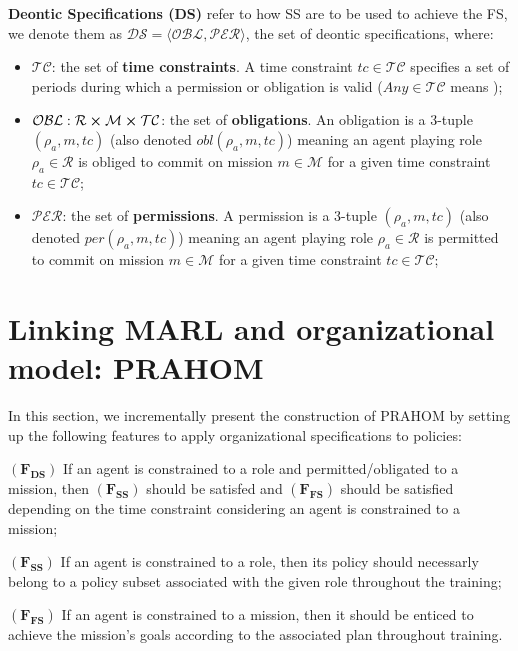 \documentclass[runningheads]{llncs}
\theoremstyle{freethm}
\theoremstyle{proofoutline}
\begin{document}
\textbf{Deontic Specifications (DS)} refer to how SS are to be used to achieve the FS, we denote them as $\mathcal{DS} = \langle \mathcal{OBL},\mathcal{PER} \rangle$, the set of deontic specifications, where:

\begin{itemize}
    \item $\mathcal{TC}$: the set of \textbf{time constraints}. A time constraint $tc \in \mathcal{TC}$ specifies a set of periods during which a permission or obligation is valid ($Any \in \mathcal{TC}$ means );
    \item $\mathcal{OBL}: \mathcal{R} \cross \mathcal{M} \cross \mathcal{TC}$: the set of \textbf{obligations}. An obligation is a 3-tuple $(\rho_a,m,tc)$ (also denoted $obl(\rho_a,m,tc)$) meaning an agent playing role $\rho_a \in \mathcal{R}$ is obliged to commit on mission $m \in \mathcal{M}$ for a given time constraint $tc \in \mathcal{TC}$;
    \item $\mathcal{PER}$: the set of \textbf{permissions}. A permission is a 3-tuple $(\rho_a,m,tc)$ (also denoted $per(\rho_a,m,tc)$) meaning an agent playing role $\rho_a \in \mathcal{R}$ is permitted to commit on mission $m \in \mathcal{M}$ for a given time constraint $tc \in \mathcal{TC}$;
\end{itemize}



\section{Linking MARL and organizational model: PRAHOM}

In this section, we incrementally present the construction of PRAHOM by setting up the following features to apply organizational specifications to policies:

\quad $(\mathbf{F_{DS}})$ \quad If an agent is constrained to a role and permitted/obligated to a mission, then $(\mathbf{F_{SS}})$ should be satisfed and $(\mathbf{F_{FS}})$ should be satisfied depending on the time constraint considering an agent is constrained to a mission;

\quad $(\mathbf{F_{SS}})$ \quad If an agent is constrained to a role, then its policy should necessarly belong to a policy subset associated with the given role throughout the training;

\quad $(\mathbf{F_{FS}})$ \quad If an agent is constrained to a mission, then it should be enticed to achieve the mission's goals according to the associated plan throughout training.
\end{document}
